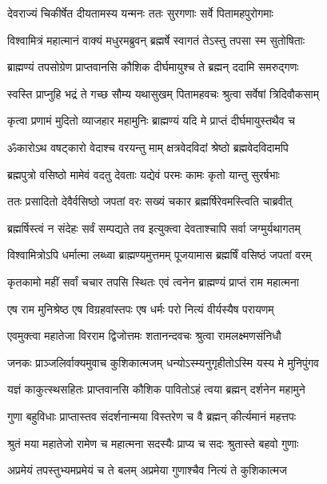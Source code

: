 \twolineshloka
{देवराज्यं चिकीर्षेत दीयतामस्य यन्मनः}
{ततः सुरगणाः सर्वे पितामहपुरोगमाः} %

\twolineshloka
{विश्वामित्रं महात्मानं वाक्यं मधुरमब्रुवन्}
{ब्रह्मर्षे स्वागतं तेऽस्तु तपसा स्म सुतोषिताः} %

\twolineshloka
{ब्राह्मण्यं तपसोग्रेण प्राप्तवानसि कौशिक}
{दीर्घमायुश्च ते ब्रह्मन् ददामि समरुद्गणः} %

\twolineshloka
{स्वस्ति प्राप्नुहि भद्रं ते गच्छ सौम्य यथासुखम्}
{पितामहवचः श्रुत्वा सर्वेषां त्रिदिवौकसाम्} %

\twolineshloka
{कृत्वा प्रणामं मुदितो व्याजहार महामुनिः}
{ब्राह्मण्यं यदि मे प्राप्तं दीर्घमायुस्तथैव च} %

\twolineshloka
{ॐकारोऽथ वषट्कारो वेदाश्च वरयन्तु माम्}
{क्षत्रवेदविदां श्रेष्ठो ब्रह्मवेदविदामपि} %

\twolineshloka
{ब्रह्मपुत्रो वसिष्ठो मामेवं वदतु देवताः}
{यद्येवं परमः कामः कृतो यान्तु सुरर्षभाः} %

\twolineshloka
{ततः प्रसादितो देवैर्वसिष्ठो जपतां वरः}
{सख्यं चकार ब्रह्मर्षिरेवमस्त्विति चाब्रवीत्} %

\twolineshloka
{ब्रह्मर्षिस्त्वं न संदेहः सर्वं सम्पद्यते तव}
{इत्युक्त्वा देवताश्चापि सर्वा जग्मुर्यथागतम्} %

\twolineshloka
{विश्वामित्रोऽपि धर्मात्मा लब्ध्वा ब्राह्मण्यमुत्तमम्}
{पूजयामास ब्रह्मर्षिं वसिष्ठं जपतां वरम्} %

\twolineshloka
{कृतकामो महीं सर्वां चचार तपसि स्थितः}
{एवं त्वनेन ब्राह्मण्यं प्राप्तं राम महात्मना} %

\twolineshloka
{एष राम मुनिश्रेष्ठ एष विग्रहवांस्तपः}
{एष धर्मः परो नित्यं वीर्यस्यैष परायणम्} %

\twolineshloka
{एवमुक्त्वा महातेजा विरराम द्विजोत्तमः}
{शतानन्दवचः श्रुत्वा रामलक्ष्मणसंनिधौ} %

\twolineshloka
{जनकः प्राञ्जलिर्वाक्यमुवाच कुशिकात्मजम्}
{धन्योऽस्म्यनुगृहीतोऽस्मि यस्य मे मुनिपुंगव} %

\twolineshloka
{यज्ञं काकुत्स्थसहितः प्राप्तवानसि कौशिक}
{पावितोऽहं त्वया ब्रह्मन् दर्शनेन महामुने} %

\twolineshloka
{गुणा बहुविधाः प्राप्तास्तव संदर्शनान्मया}
{विस्तरेण च वै ब्रह्मन् कीर्त्यमानं महत्तपः} %

\twolineshloka
{श्रुतं मया महातेजो रामेण च महात्मना}
{सदस्यैः प्राप्य च सदः श्रुतास्ते बहवो गुणाः} %

\twolineshloka
{अप्रमेयं तपस्तुभ्यमप्रमेयं च ते बलम्}
{अप्रमेया गुणाश्चैव नित्यं ते कुशिकात्मज} %

